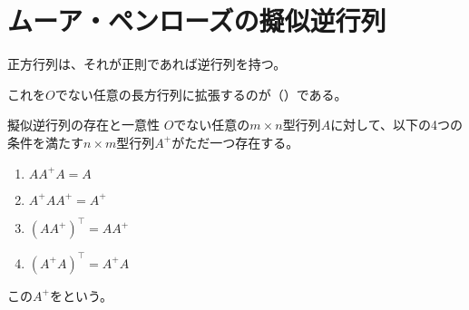 \documentclass[../../../topic_linear-algebra]{subfiles}
\begin{document}
\sectionline
\section{ムーア・ペンローズの擬似逆行列}

正方行列は、それが正則であれば逆行列を持つ。

これを$O$でない任意の長方行列に拡張するのが（）である。

\begin{theorem}{擬似逆行列の存在と一意性}
  $O$でない任意の$m \times n$型行列$A$に対して、以下の4つの条件を満たす$n \times m$型行列$A^+$がただ一つ存在する。
  \begin{enumerate}[label=\romanlabel]
    \item $AA^+A = A$
    \item $A^+AA^+ = A^+$
    \item $(AA^+)^\top = AA^+$
    \item $(A^+A)^\top = A^+A$
  \end{enumerate}
  この$A^+$をという。
\end{theorem}
\end{document}
